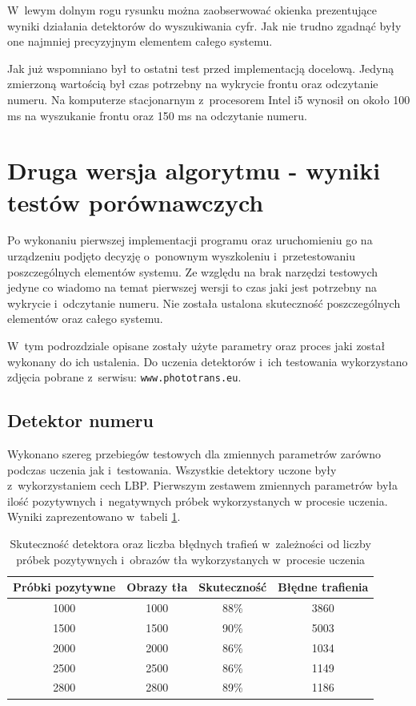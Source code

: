 W~lewym dolnym rogu rysunku można zaobserwować okienka prezentujące
wyniki działania detektorów do wyszukiwania cyfr. Jak nie trudno
zgadnąć były one najmniej precyzyjnym elementem całego systemu.

Jak już wspomniano był to ostatni test przed implementacją 
docelową. Jedyną zmierzoną wartością był czas potrzebny na wykrycie
frontu oraz odczytanie numeru. Na komputerze stacjonarnym z~procesorem
Intel i5 wynosił on około 100 ms na wyszukanie frontu oraz 150 ms na
odczytanie numeru. 


\section{Druga wersja algorytmu - wyniki testów porównawczych}

Po wykonaniu pierwszej implementacji programu oraz 
uruchomieniu go na urządzeniu podjęto decyzję o~ponownym 
wyszkoleniu i~przetestowaniu poszczególnych elementów systemu.
Ze względu na brak narzędzi testowych jedyne co wiadomo 
na temat pierwszej wersji to czas jaki jest potrzebny
na wykrycie i~odczytanie numeru.
Nie została ustalona skuteczność poszczególnych
elementów oraz całego systemu.

W~tym podrozdziale opisane zostały użyte parametry oraz proces
jaki został wykonany do ich ustalenia. Do uczenia detektorów
i~ich testowania wykorzystano zdjęcia pobrane z~serwisu:
\verb|www.phototrans.eu|.


\subsection{Detektor numeru}

Wykonano szereg przebiegów testowych dla zmiennych parametrów zarówno
podczas uczenia jak i~testowania. Wszystkie detektory uczone były
z~wykorzystaniem cech LBP. Pierwszym zestawem zmiennych parametrów
była ilość pozytywnych i~negatywnych próbek wykorzystanych w procesie
uczenia. Wyniki zaprezentowano w~tabeli 
\ref{tab:final_number_detector_numposneg}.

\begin{table}[!h]
    \centering
    \begin{tabular}{c|c|c|c}
        Próbki pozytywne & Obrazy tła & Skuteczność & Błędne trafienia
        \\ \hline
        1000 & 1000 & 88\% & 3860 \\
        1500 & 1500 & 90\% & 5003 \\
        2000 & 2000 & 86\% & 1034 \\
        2500 & 2500 & 86\% & 1149 \\
        2800 & 2800 & 89\% & 1186 \\
    \end{tabular}
    \caption{Skuteczność detektora oraz liczba błędnych trafień
    w~zależności od liczby próbek pozytywnych i~obrazów tła
wykorzystanych w~procesie uczenia}
    \label{tab:final_number_detector_numposneg}
\end{table}

